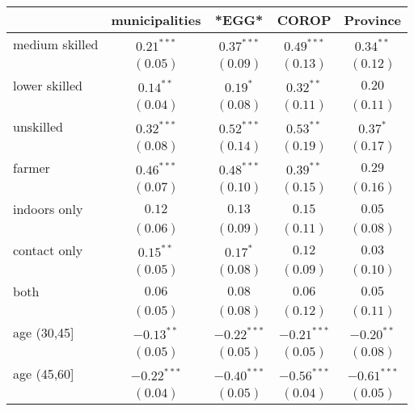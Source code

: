 
\begin{table}[h!]
\begin{center}
\begin{small}
\begin{tabular}{l c c c c}
\hline
 & municipalities & *EGG* & COROP & Province \\
\hline
medium skilled     & $0.21^{***}$  & $0.37^{***}$  & $0.49^{***}$  & $0.34^{**}$   \\
                   & $(0.05)$      & $(0.09)$      & $(0.13)$      & $(0.12)$      \\
lower skilled      & $0.14^{**}$   & $0.19^{*}$    & $0.32^{**}$   & $0.20$        \\
                   & $(0.04)$      & $(0.08)$      & $(0.11)$      & $(0.11)$      \\
unskilled          & $0.32^{***}$  & $0.52^{***}$  & $0.53^{**}$   & $0.37^{*}$    \\
                   & $(0.08)$      & $(0.14)$      & $(0.19)$      & $(0.17)$      \\
farmer             & $0.46^{***}$  & $0.48^{***}$  & $0.39^{**}$   & $0.29$        \\
                   & $(0.07)$      & $(0.10)$      & $(0.15)$      & $(0.16)$      \\
indoors only       & $0.12$        & $0.13$        & $0.15$        & $0.05$        \\
                   & $(0.06)$      & $(0.09)$      & $(0.11)$      & $(0.08)$      \\
contact only       & $0.15^{**}$   & $0.17^{*}$    & $0.12$        & $0.03$        \\
                   & $(0.05)$      & $(0.08)$      & $(0.09)$      & $(0.10)$      \\
both               & $0.06$        & $0.08$        & $0.06$        & $0.05$        \\
                   & $(0.05)$      & $(0.08)$      & $(0.12)$      & $(0.11)$      \\
age (30,45]        & $-0.13^{**}$  & $-0.22^{***}$ & $-0.21^{***}$ & $-0.20^{**}$  \\
                   & $(0.05)$      & $(0.05)$      & $(0.05)$      & $(0.08)$      \\
age (45,60]        & $-0.22^{***}$ & $-0.40^{***}$ & $-0.56^{***}$ & $-0.61^{***}$ \\
                   & $(0.04)$      & $(0.05)$      & $(0.04)$      & $(0.05)$      \\

\end{tabular}
\end{small}
\end{center}
\end{table}
